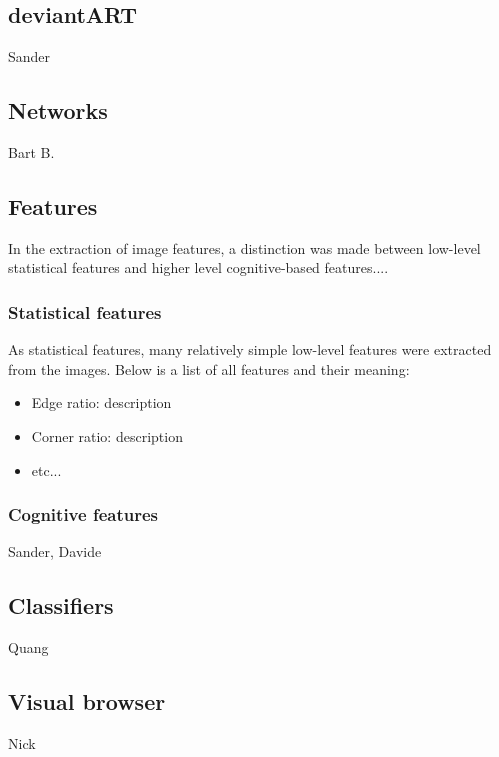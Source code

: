 \subsection{deviantART}
Sander

\subsection{Networks}
Bart B.

\subsection{Features}
In the extraction of image features, a distinction was made between low-level statistical features and higher level cognitive-based features....

\subsubsection{Statistical features}
As statistical features, many relatively simple low-level features were extracted from the images. Below is a list of all features and their meaning:
\begin{itemize}
\item Edge ratio: description
\item Corner ratio: description
\item etc...
\end{itemize}
\subsubsection{Cognitive features}
Sander, Davide

\subsection{Classifiers}
Quang

\subsection{Visual browser}
Nick

